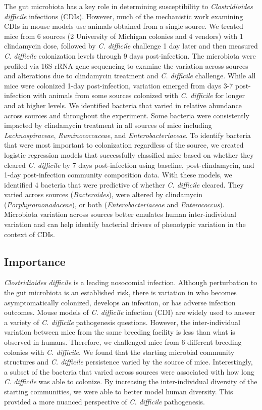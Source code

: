 \documentclass[
  11pt,
]{article}
\begin{document}
The gut microbiota has a key role in determining susceptibility to
\emph{Clostridioides difficile} infections (CDIs). However, much of the
mechanistic work examining CDIs in mouse models use animals obtained
from a single source. We treated mice from 6 sources (2 University of
Michigan colonies and 4 vendors) with 1 clindamycin dose, followed by
\emph{C. difficile} challenge 1 day later and then measured \emph{C.
difficile} colonization levels through 9 days post-infection. The
microbiota were profiled via 16S rRNA gene sequencing to examine the
variation across sources and alterations due to clindamycin treatment
and \emph{C. difficile} challenge. While all mice were colonized 1-day
post-infection, variation emerged from days 3-7 post-infection with
animals from some sources colonized with \emph{C. difficile} for longer
and at higher levels. We identified bacteria that varied in relative
abundance across sources and throughout the experiment. Some bacteria
were consistently impacted by clindamycin treatment in all sources of
mice including \emph{Lachnospiraceae}, \emph{Ruminococcaceae}, and
\emph{Enterobacteriaceae}. To identify bacteria that were most important
to colonization regardless of the source, we created logistic regression
models that successfully classified mice based on whether they cleared
\emph{C. difficile} by 7 days post-infection using baseline,
post-clindamycin, and 1-day post-infection community composition data.
With these models, we identified 4 bacteria that were predictive of
whether \emph{C. difficile} cleared. They varied across sources
(\emph{Bacteroides}), were altered by clindamycin
(\emph{Porphyromonadaceae}), or both (\emph{Enterobacteriaceae} and
\emph{Enterococcus}). Microbiota variation across sources better
emulates human inter-individual variation and can help identify
bacterial drivers of phenotypic variation in the context of CDIs.

\hypertarget{importance}{%
\subsection{Importance}\label{importance}}

\emph{Clostridioides difficile} is a leading nosocomial infection.
Although perturbation to the gut microbiota is an established risk,
there is variation in who becomes asymptomatically colonized, develops
an infection, or has adverse infection outcomes. Mouse models of
\emph{C. difficile} infection (CDI) are widely used to answer a variety
of \emph{C. difficile} pathogenesis questions. However, the
inter-individual variation between mice from the same breeding facility
is less than what is observed in humans. Therefore, we challenged mice
from 6 different breeding colonies with \emph{C. difficile}. We found
that the starting microbial community structures and \emph{C. difficile}
persistence varied by the source of mice. Interestingly, a subset of the
bacteria that varied across sources were associated with how long
\emph{C. difficile} was able to colonize. By increasing the
inter-individual diversity of the starting communities, we were able to
better model human diversity. This provided a more nuanced perspective
of \emph{C. difficile} pathogenesis.
\end{document}
